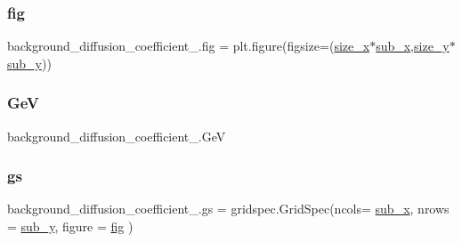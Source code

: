 \subsubsection{\texorpdfstring{fig}{fig}}
{\footnotesize\ttfamily background\+\_\+diffusion\+\_\+coefficient\+\_.\+fig = plt.\+figure(figsize=(\hyperlink{namespacebackground__diffusion__coefficient__3_aa496de627bc7ba32809e91931743db41}{size\+\_\+x}$\ast$\hyperlink{namespacebackground__diffusion__coefficient__3_a62e8135e741ff9c9842eb5404a128a14}{sub\+\_\+x},\hyperlink{namespacebackground__diffusion__coefficient__3_a06682c3c075d82efb8cd5a23c13222b0}{size\+\_\+y}$\ast$\hyperlink{namespacebackground__diffusion__coefficient__3_a3ab25d79e76e2bd1e87fec0b12065115}{sub\+\_\+y}))}

\mbox{\label{namespacebackground__diffusion__coefficient__3_a7558be3411c500a689c600ae94f9d7ee}} 
\subsubsection{\texorpdfstring{GeV}{GeV}}
{\footnotesize\ttfamily background\+\_\+diffusion\+\_\+coefficient\+\_.\+GeV}

\mbox{\label{namespacebackground__diffusion__coefficient__3_a30d6f837e781a9234441d0aafd73f9b6}} 
\subsubsection{\texorpdfstring{gs}{gs}}
{\footnotesize\ttfamily background\+\_\+diffusion\+\_\+coefficient\+\_.\+gs = gridspec.\+Grid\+Spec(ncols= \hyperlink{namespacebackground__diffusion__coefficient__3_a62e8135e741ff9c9842eb5404a128a14}{sub\+\_\+x}, nrows = \hyperlink{namespacebackground__diffusion__coefficient__3_a3ab25d79e76e2bd1e87fec0b12065115}{sub\+\_\+y}, figure = \hyperlink{namespacebackground__diffusion__coefficient__3_a345c6968f6e40b8d3876e2ef18eb6aad}{fig} )}

